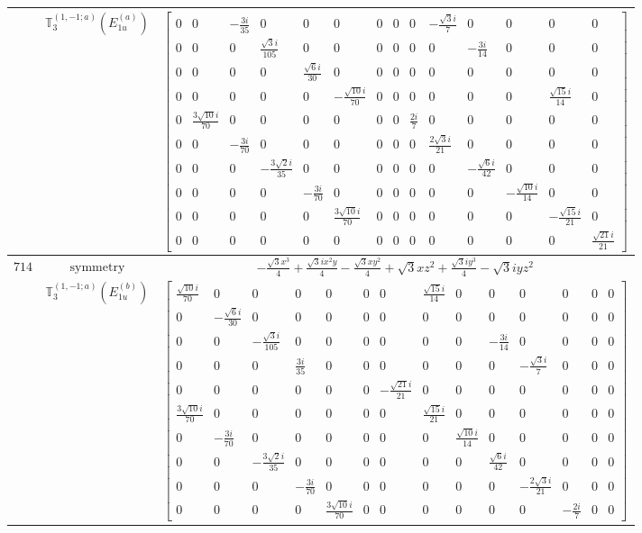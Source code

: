 \documentclass[fleqn,8pt,landscape]{jsarticle}
\begin{document}
\begin{longtable}{ccc}
$  $ & $ \mathbb{T}_{3}^{(1,-1;a)}(E_{1u}^{(a)}) $ & $ \begin{bmatrix} 0 & 0 & - \frac{3 i}{35} & 0 & 0 & 0 & 0 & 0 & 0 & - \frac{\sqrt{3} i}{7} & 0 & 0 & 0 & 0 \\ 0 & 0 & 0 & \frac{\sqrt{3} i}{105} & 0 & 0 & 0 & 0 & 0 & 0 & - \frac{3 i}{14} & 0 & 0 & 0 \\ 0 & 0 & 0 & 0 & \frac{\sqrt{6} i}{30} & 0 & 0 & 0 & 0 & 0 & 0 & 0 & 0 & 0 \\ 0 & 0 & 0 & 0 & 0 & - \frac{\sqrt{10} i}{70} & 0 & 0 & 0 & 0 & 0 & 0 & \frac{\sqrt{15} i}{14} & 0 \\ 0 & \frac{3 \sqrt{10} i}{70} & 0 & 0 & 0 & 0 & 0 & 0 & \frac{2 i}{7} & 0 & 0 & 0 & 0 & 0 \\ 0 & 0 & - \frac{3 i}{70} & 0 & 0 & 0 & 0 & 0 & 0 & \frac{2 \sqrt{3} i}{21} & 0 & 0 & 0 & 0 \\ 0 & 0 & 0 & - \frac{3 \sqrt{2} i}{35} & 0 & 0 & 0 & 0 & 0 & 0 & - \frac{\sqrt{6} i}{42} & 0 & 0 & 0 \\ 0 & 0 & 0 & 0 & - \frac{3 i}{70} & 0 & 0 & 0 & 0 & 0 & 0 & - \frac{\sqrt{10} i}{14} & 0 & 0 \\ 0 & 0 & 0 & 0 & 0 & \frac{3 \sqrt{10} i}{70} & 0 & 0 & 0 & 0 & 0 & 0 & - \frac{\sqrt{15} i}{21} & 0 \\ 0 & 0 & 0 & 0 & 0 & 0 & 0 & 0 & 0 & 0 & 0 & 0 & 0 & \frac{\sqrt{21} i}{21} \end{bmatrix} $ \\ \hline
$ 714 $ & $ \text{symmetry} $ & $ - \frac{\sqrt{3} x^{3}}{4} + \frac{\sqrt{3} i x^{2} y}{4} - \frac{\sqrt{3} x y^{2}}{4} + \sqrt{3} x z^{2} + \frac{\sqrt{3} i y^{3}}{4} - \sqrt{3} i y z^{2} $ \\
$  $ & $ \mathbb{T}_{3}^{(1,-1;a)}(E_{1u}^{(b)}) $ & $ \begin{bmatrix} \frac{\sqrt{10} i}{70} & 0 & 0 & 0 & 0 & 0 & 0 & \frac{\sqrt{15} i}{14} & 0 & 0 & 0 & 0 & 0 & 0 \\ 0 & - \frac{\sqrt{6} i}{30} & 0 & 0 & 0 & 0 & 0 & 0 & 0 & 0 & 0 & 0 & 0 & 0 \\ 0 & 0 & - \frac{\sqrt{3} i}{105} & 0 & 0 & 0 & 0 & 0 & 0 & - \frac{3 i}{14} & 0 & 0 & 0 & 0 \\ 0 & 0 & 0 & \frac{3 i}{35} & 0 & 0 & 0 & 0 & 0 & 0 & - \frac{\sqrt{3} i}{7} & 0 & 0 & 0 \\ 0 & 0 & 0 & 0 & 0 & 0 & - \frac{\sqrt{21} i}{21} & 0 & 0 & 0 & 0 & 0 & 0 & 0 \\ \frac{3 \sqrt{10} i}{70} & 0 & 0 & 0 & 0 & 0 & 0 & \frac{\sqrt{15} i}{21} & 0 & 0 & 0 & 0 & 0 & 0 \\ 0 & - \frac{3 i}{70} & 0 & 0 & 0 & 0 & 0 & 0 & \frac{\sqrt{10} i}{14} & 0 & 0 & 0 & 0 & 0 \\ 0 & 0 & - \frac{3 \sqrt{2} i}{35} & 0 & 0 & 0 & 0 & 0 & 0 & \frac{\sqrt{6} i}{42} & 0 & 0 & 0 & 0 \\ 0 & 0 & 0 & - \frac{3 i}{70} & 0 & 0 & 0 & 0 & 0 & 0 & - \frac{2 \sqrt{3} i}{21} & 0 & 0 & 0 \\ 0 & 0 & 0 & 0 & \frac{3 \sqrt{10} i}{70} & 0 & 0 & 0 & 0 & 0 & 0 & - \frac{2 i}{7} & 0 & 0 \end{bmatrix} $ \\ \hline

\end{longtable}
\end{document}
